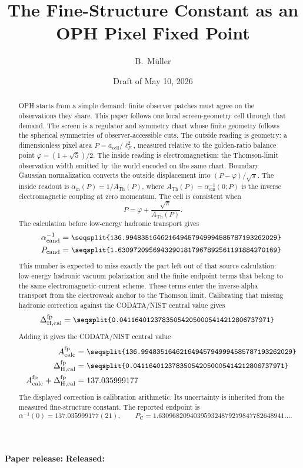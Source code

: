\documentclass[11pt]{article}
\title{\textbf{The Fine-Structure Constant as an OPH Pixel Fixed Point}}
\author{B.\ M\"uller}
\date{Draft of May 10, 2026}
\theoremstyle{remark}
\newcommand{\alphainv}{\alpha^{-1}}
\newcommand{\ATh}{A_{\mathrm{Th}}}
\newcommand{\Dcalib}{\Delta_{\mathrm{H,cal}}}
\newcommand{\decnum}[1]{\vcenter{\hbox{\parbox{0.68\linewidth}{\small\ttfamily\seqsplit{#1}}}}}
\begin{document}
\maketitle
\begin{center}
\small\textbf{Paper release:} \OPHPaperReleaseID\quad
\textbf{Released:} \OPHPaperReleaseDate
\end{center}

\begin{abstract}
OPH starts from a simple demand: finite observer patches must agree on the observations they share. This paper follows one local screen-geometry cell through that demand. The screen is a regulator and symmetry chart whose finite geometry follows the spherical symmetries of observer-accessible cuts. The outside reading is geometry: a dimensionless pixel area \(P=a_{\mathrm{cell}}/\ell_P^2\), measured relative to the golden-ratio balance point \(\varphi=(1+\sqrt5)/2\). The inside reading is electromagnetism: the Thomson-limit observation width emitted by the world encoded on the same chart. Boundary Gaussian normalization converts the outside displacement into \((P-\varphi)/\sqrt\pi\). The inside readout is \(\alpha_{\mathrm{in}}(P)=1/\ATh(P)\), where \(\ATh(P)=\alpha_{\mathrm{em}}^{-1}(0;P)\) is the inverse electromagnetic coupling at zero momentum. The cell is consistent when
\[
P=\varphi+\frac{\sqrt\pi}{\ATh(P)}.
\]
The calculation before low-energy hadronic transport gives
\[
\begin{aligned}
\alphainv_{\mathrm{cand}}&=\decnum{136.994835164621649457949994585787193262029}\\
P_{\mathrm{cand}}&=\decnum{1.63097209569432901817967892561191884270169}
\end{aligned}
\]
This number is expected to miss exactly the part left out of that source calculation: low-energy hadronic vacuum polarization and the finite endpoint terms that belong to the same electromagnetic-current scheme. These terms enter the inverse-alpha transport from the electroweak anchor to the Thomson limit. Calibrating that missing hadronic correction against the CODATA/NIST central value gives
\[
\Dcalib^{\mathrm{fp}}
=
\decnum{0.041164012378350542050005414212806737971}
\]
Adding it gives the CODATA/NIST central value
\[
\begin{aligned}
A_{\mathrm{calc}}^{\mathrm{fp}}
&=
\decnum{136.994835164621649457949994585787193262029}\\
\Dcalib^{\mathrm{fp}}
&=
\decnum{0.041164012378350542050005414212806737971}\\
A_{\mathrm{calc}}^{\mathrm{fp}}+\Dcalib^{\mathrm{fp}}
&=
137.035999177
\end{aligned}
\]
The displayed correction is calibration arithmetic. Its uncertainty is inherited from the measured fine-structure constant. The reported endpoint is
\[
\alphainv(0)=137.035999177(21),
\qquad
P_{\mathrm C}=1.630968209403959324879279847782648941\ldots .
\]
\end{abstract}
\end{document}
